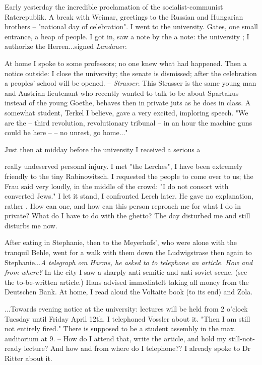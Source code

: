 
Early yesterday the incredible proclamation of the socialist-communist Raterepublik. A break with Weimar, greetings to the Russian and Hungarian brothers -- "national day of celebration". I went to the university. Gates, one small entrance, a heap of people. I got in, saw a note by the  a note: the university ; I authorize the Herren...signed \textit{Landauer}.

At home I spoke to some professors; no one knew what had happened. Then a notice outside: I close the university; the senate is dismissed; after the celebration a peoples' school will be opened. -- \textit{Strasser}. This Strasser is the same young man and Austrian lieutenant who recently wanted to talk to be about Spartakus instead of the young Goethe, behaves then in private juts as he does in class. A somewhat  student, Terkel I believe, gave a very excited, imploring speech. "We are the  -- third revolution, revolutionary tribunal -- in an hour the machine guns could be here --  -- no unrest, go home..."

Just then at midday before the university I received a serious a

 really undeserved personal injury. I met "the Lerches", I have been extremely friendly to the tiny Rabinowitsch. I requested the people to come over to us; the Frau said very loudly, in the middle of the crowd: "I do not consort with converted Jews." I let it stand, I confronted Lerch later. He gave no explanation, rather . How can one, and how can this person reproach me for what I do in private? What do I have to do with the ghetto? The day disturbed me and still disturbs me now.
 
 After eating in Stephanie, then to the Meyerhofs', who were alone with the tranquil Behle, went for a walk with them down the Ludwigstrase then again to Stephanie...\textit{A telegraph 
 om Harms, he asked to to telephone an article. How and from where?} In the city I saw a sharply anti-semitic and anti-soviet scene. (see the to-be-written article.) Hans advised immediatelt taking all money from the Deutschen Bank. At home, I read aloud the Voltaite book (to its end) and Zola.
 
...Towards evening notice at the university: lectures will be held from 2 o'clock Tuesday until Friday April 12th. I telephoned Vossler about it. "Then I am still not entirely fired." There is supposed to be a student assembly in the max. auditorium at 9. -- How do I attend that, write the article, and hold my still-not-ready lecture? And how and from where do I telephone?? I already spoke to Dr Ritter about it.
